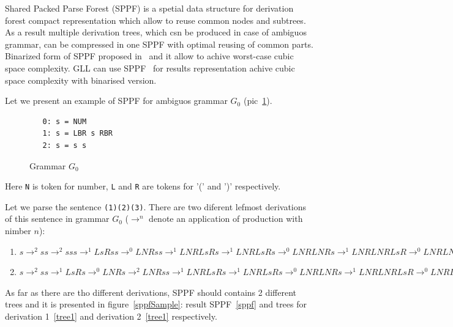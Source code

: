 \documentclass{sig-alternate} %
\begin{document}
Shared Packed Parse Forest (SPPF) is a spetial data structure for derivation forest compact representation which allow to reuse common nodes and subtrees.
As a result multiple derivation trees, which csn be produced in case of ambiguos grammar, can be compressed in one SPPF with optimal reusing of common parts.  
Binarized form of SPPF proposed in~\cite{brnglr} and it allow to achive worst-case cubic space complexity.
GLL can use SPPF~\cite{gllParsingTree} for results representation achive cubic space complexity with binarised version.

Let we present an example of SPPF for ambiguos grammar $G_0$ (pic~\ref{grammarG0}).

\begin{figure}[h]
   \begin{center}
\begin{verbatim}
   0: s = NUM
   1: s = LBR s RBR
   2: s = s s
\end{verbatim}
   \caption{Grammar $G_0$}
   \label{grammarG0}        
   \end{center}
\end{figure}

Here \verb|N| is token for number, \verb|L| and \verb|R| are tokens for '(' and ')'  respectively.

Let we parse the sentence \verb|(1)(2)(3)|. 
There are two diferent lefmost derivations of this sentence in grammar $G_0$ ($\rightarrow ^ n$ denote an application of production with nimber $n$): 
\begin{enumerate} 
    \item $s \rightarrow ^ 2 s s \rightarrow ^ 2 s s s \rightarrow ^ 1 L s R s s \rightarrow ^ 0 L N R s s \rightarrow ^ 1 
    L N R L s R s \rightarrow ^ 1 L N R L s R s \rightarrow ^ 0 L N R L N R s \rightarrow ^ 1 L N R L N R L s R \rightarrow ^ 0 L N R L N R L N R$
    \item $s \rightarrow ^ 2 s s \rightarrow ^ 1 L s R s  \rightarrow ^ 0 L N R s \rightarrow ^ 2 L N R s s  \rightarrow ^ 1 
    L N R L s R s \rightarrow ^ 1 L N R L s R s \rightarrow ^ 0 L N R L N R s \rightarrow ^ 1 L N R L N R L s R \rightarrow ^ 0 L N R L N R L N R$
\end{enumerate}
    As far as there are tho different derivations, SPPF should contains 2 different trees and it is presented in figure~\ref{sppfSample}: result SPPF~\ref{sppf} and trees for derivation 1~\ref{tree1} and derivation 2~\ref{tree1} respectively. 
\end{document}
